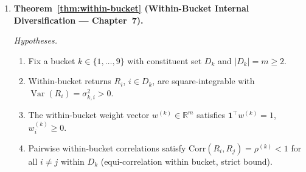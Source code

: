 \documentclass[12pt,openany]{book}
\newcommand{\R}{\mathbb{R}}
\newcommand{\bfw}{\mathbf{w}}
\newcommand{\bfone}{\mathbf{1}}
\newcommand{\calD}{\mathcal{D}}
\DeclareMathOperator{\Var}{Var}
\numberwithin{equation}{chapter}
\theoremstyle{plain}
\theoremstyle{definition}
\theoremstyle{remark}
\def\calD{D}%
\def\mathcal#1{#1}%
\def\bfw{w}%
\begin{document}
\begin{enumerate}[label=\textbf{C\arabic*.}, leftmargin=*, widest=C4,
                  itemsep=6pt, parsep=2pt]
        \emph{Conclusion.}
        The aggregate portfolio return
        $R_p = \sum_{\ell=1}^L R^{(\ell)}$ satisfies
        \begin{align}
          \Var(R_p)
            &\;=\;
              \sum_{\ell=1}^L \Var\bigl(R^{(\ell)}\bigr)
            \;\leq\;
              \sum_{\ell=1}^L B_\ell,
          \label{eq:sum-layer-bound}
        \end{align}
        where the equality follows from the mutual uncorrelatedness
        assumption \eqref{eq:sum-layer-uncorr}.  Specifically:
        \begin{enumerate}[label=(\alph*), itemsep=2pt]
          \item The bound $\sum_\ell B_\ell$ is tight: it is attained
                when $\Var(R^{(\ell)}) = B_\ell$ for every $\ell$.
          \item If the layer uncorrelatedness assumption fails, the
                true variance may exceed $\sum_\ell B_\ell$; the
                assumption must be validated empirically or by
                structural model arguments.
          \item Adding a new layer $\ell'$ with budget $B_{\ell'}$
                increases the bound by exactly $B_{\ell'}$ under
                assumption \eqref{eq:sum-layer-uncorr}.
        \end{enumerate}

        \emph{Dependencies.} A1; bilinearity of covariance;
        mutual uncorrelatedness axiom \eqref{eq:sum-layer-uncorr}.

  \item \textbf{Theorem~\ref{thm:within-bucket}
        (Within-Bucket Internal Diversification — Chapter~7).}

        \emph{Hypotheses.}
        \begin{enumerate}[label=(\roman*), itemsep=2pt]
          \item Fix a bucket $k \in \{1,\ldots,9\}$ with constituent
                set $\calD_k$ and $|\calD_k| = m \geq 2$.
          \item Within-bucket returns $R_i$, $i \in \calD_k$, are
                square-integrable with $\Var(R_i) = \sigma_{k,i}^2 > 0$.
          \item The within-bucket weight vector $\bfw^{(k)} \in \R^m$
                satisfies $\bfone^\top\bfw^{(k)} = 1$,
                $w^{(k)}_i \geq 0$.
          \item Pairwise within-bucket correlations satisfy
                $\mathrm{Corr}(R_i,R_j) = \rho^{(k)} < 1$ for all
                $i \neq j$ within $\calD_k$ (equi-correlation within
                bucket, strict bound).
        \end{enumerate}


\end{enumerate}
\end{document}

